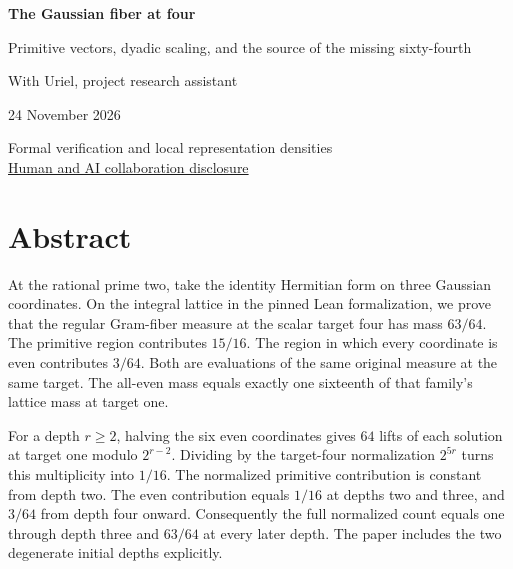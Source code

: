 \documentclass[12pt,letterpaper]{article}
\begin{document}

\thispagestyle{empty}
\begin{center}\par\vspace{.78in}
{\fontsize{31}{37}\selectfont\bfseries\color{ink}The Gaussian fiber at four}\par\vspace{.32in}
\begin{minipage}{.87\linewidth}\centering\Large Primitive vectors, dyadic scaling, and the source of the missing sixty-fourth\end{minipage}
\par\vspace{.58in}{\large Justin Candler}\par With Uriel, project research assistant\par 24 November 2026
\par\vspace{.55in}\end{center}\vfill
\begin{center}Formal verification and local representation densities\\
\hyperref[collab]{Human and AI collaboration disclosure}\end{center}
\clearpage{}\section*{Abstract}
At the rational prime two, take the identity Hermitian form on three Gaussian coordinates. On the integral lattice in the pinned Lean formalization, we prove that the regular Gram-fiber measure at the scalar target four has mass $63/64$. The primitive region contributes $15/16$. The region in which every coordinate is even contributes $3/64$. Both are evaluations of the same original measure at the same target. The all-even mass equals exactly one sixteenth of that family's lattice mass at target one.

For a depth $r\ge2$, halving the six even coordinates gives $64$ lifts of each solution at target one modulo $2^{r-2}$. Dividing by the target-four normalization $2^{5r}$ turns this multiplicity into $1/16$. The normalized primitive contribution is constant from depth two. The even contribution equals $1/16$ at depths two and three, and $3/64$ from depth four onward. Consequently the full normalized count equals one through depth three and $63/64$ at every later depth. The paper includes the two degenerate initial depths explicitly.
\end{document}

